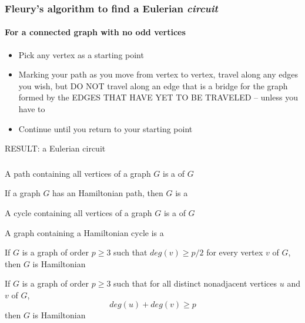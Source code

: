 \documentclass[aspectratio=169]{beamer}\usepackage[]{graphicx}\usepackage[]{xcolor}
\begin{document}
\begin{frame}
	\frametitle{Fleury's algorithm to find a Eulerian \emph{circuit}}
	\framesubtitle{For a connected graph with no odd vertices}

	\begin{itemize}
	\item Pick any vertex as a starting point
	\item Marking your path as you move from vertex to vertex, travel along any edges you wish, but DO NOT travel along an edge that is a bridge for the graph formed by the EDGES THAT HAVE YET TO BE TRAVELED -- unless you have to
	\item Continue until you return to your starting point
\end{itemize}
RESULT: a Eulerian circuit
\end{frame}




\begin{frame}\frametitle{}
\begin{definition}
	A path containing all vertices of a graph $G$ is a  of $G$
\end{definition}
\vfill
\begin{definition}
	If a graph $G$ has an Hamiltonian path, then $G$ is a 
\end{definition}
\vfill
\begin{definition}
	A cycle containing all vertices of a graph $G$ is a  of $G$
\end{definition}
\vfill
\begin{definition}
	A graph containing a Hamiltonian cycle is a 
\end{definition}
\end{frame}

\begin{frame}
\begin{theorem}
	If $G$ is a graph of order $p\geq 3$ such that $deg(v)\geq p/2$ for every vertex $v$ of $G$, then $G$ is Hamiltonian
\end{theorem}
\vfill
\begin{theorem}
	If $G$ is a graph of order $p\geq 3$ such that for all distinct nonadjacent vertices $u$ and $v$ of $G$, $$deg(u)+deg(v)\geq p$$ 
	then $G$ is Hamiltonian
\end{theorem}
\end{frame}
\end{document}
